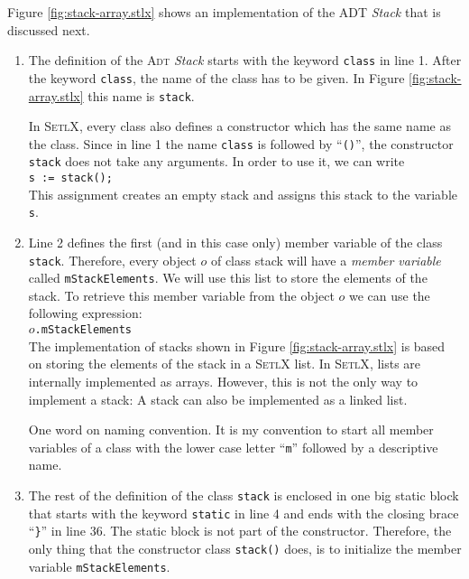 Figure \ref{fig:stack-array.stlx} shows an implementation of the ADT \textsl{Stack} that is 
discussed next.
\begin{enumerate}
\item The definition of the \textsc{Adt} \textsl{Stack} starts with the keyword \texttt{class}
      in line 1.
      After the keyword \texttt{class}, the name of the class has to be given.  In Figure
      \ref{fig:stack-array.stlx} this name is \texttt{stack}.

      In \textsc{SetlX}, every class also defines a constructor which has the same name as the class.
      Since in line 1 the name \texttt{class} is followed by ``\texttt{()}'', the constructor
      \texttt{stack} does not take any arguments.  In order to use it, we can write
      \\[0.2cm]
      \hspace*{1.3cm}
      \texttt{s := stack();}
      \\[0.2cm]
      This assignment creates an empty stack and assigns this stack to the variable \texttt{s}.
\item Line 2 defines the first (and in this case only) member variable of the class \texttt{stack}.
      Therefore, every object $o$ of class stack will have a \emph{member variable} called
      \texttt{mStackElements}. 
      We will use this list to store the elements of the stack.  To retrieve this member variable from
      the object $o$ we can use the following expression:
      \\[0.2cm]
      \hspace*{1.3cm}
      $o$\texttt{.mStackElements}
      \\[0.2cm]
      The implementation of stacks shown
      in Figure \ref{fig:stack-array.stlx} is based on storing the elements of the stack in a
      \textsc{SetlX} list.  In \textsc{SetlX}, lists are internally implemented as arrays.  However,
      this is not the only way to implement a stack: A stack can also be implemented as a linked list.

      One word on naming convention.  It is my convention to start all member variables of a class
      with the lower case letter ``\texttt{m}'' followed by a descriptive name.
\item The rest of the definition of the class \texttt{stack} is enclosed in one big static
      block that starts with the keyword \texttt{static} in line 4 and ends with the closing brace 
      ``\texttt{\}}'' in line 36.  The static block is not part of the constructor.
      Therefore, the only thing that the constructor class
      \texttt{stack()} does, is to initialize the member variable \texttt{mStackElements}.


\end{enumerate}
